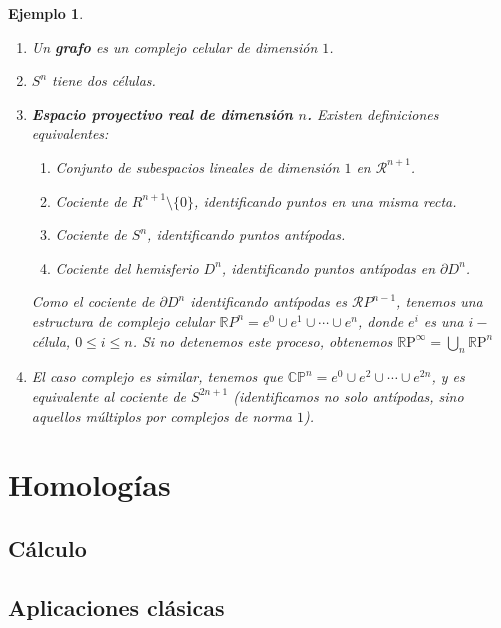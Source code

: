 \documentclass[12pt]{book}
\newtheorem{eje}{Ejemplo}
\begin{document}
\begin{eje}
\begin{enumerate}
\item Un \textbf{grafo} es un complejo celular de dimensión $1$.
\item $S^n$ tiene dos células. 

\item \textbf{Espacio proyectivo real de dimensión $n$.} Existen definiciones equivalentes:
\begin{enumerate}
	\item Conjunto de subespacios lineales de dimensión $1$ en $\mathcal{R}^{n+1}$.
\item Cociente de $R^{n+1} \setminus \{0\} $, identificando puntos en una misma recta.
\item Cociente de $S^n$, identificando puntos antípodas.
\item Cociente del hemisferio $ D^n $, identificando puntos antípodas en $\partial D^n$.
\end{enumerate} Como el cociente de $\partial D^n$ identificando antípodas es $\mathcal{R}P^{n-1}$, tenemos una estructura de complejo celular $\mathbb{R}P^n = e^0 \cup e^1 \cup \cdots \cup e^n $, donde $e^i$ es una $i-$célula, $0 \leq i\leq n$. Si no detenemos este proceso, obtenemos $\mathbb{R} \mathrm{P}^{\infty}=\bigcup_n \mathbb{R} \mathrm{P}^n$


\item El caso complejo es similar, tenemos que $\mathbb{C P}^n=e^0 \cup e^2 \cup \cdots \cup e^{2 n}$, y es equivalente al cociente de $S^{2n+1}$ (identificamos no solo antípodas, sino aquellos múltiplos por complejos de norma $1$).
\end{enumerate}
\end{eje}








\chapter{Homologías}

\section{Cálculo}




\section{Aplicaciones clásicas}
\end{document}
